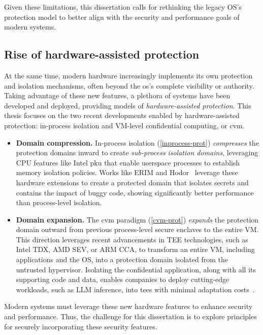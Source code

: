 Given these limitations, this dissertation calls for rethinking the legacy OS's protection model to better align with the security and performance goals of modern systems.




\subsection{Rise of hardware-assisted protection}

At the same time, modern hardware increasingly implements its own protection and isolation mechanisms, often beyond the \gls{os}'s complete visibility or authority.
Taking advantage of these new features, a plethora of systems have been developed and deployed, providing models of \emph{hardware-assisted protection}.
This thesis focuses on the two recent developments enabled by hardware-assisted protection: in-process isolation and VM-level confidential computing, or \gls{cvm}.

\begin{itemize}
	\item \textbf{Domain compression.} In-process isolation (\autoref{inprocess-prot}) \emph{compresses} the protection domains inward to create \emph{sub-process isolation domains}, leveraging CPU features like Intel \gls{pku} that enable  userspace processes to establish memory isolation policies.
	      Works like ERIM and Hodor~\cite{erim,hodor} leverage these hardware extensions to create a protected domain that isolates secrets and contains the impact of buggy code, showing significantly better performance than process-level isolation.
	\item \textbf{Domain expansion.} The \gls{cvm} paradigm (\autoref{cvm-prot}) \emph{expands} the protection domain outward from previous process-level secure enclaves to the entire VM.
	      This direction leverages recent advancements in TEE technologies, such as Intel TDX, AMD SEV, or ARM CCA, to transform an entire VM, including applications and the OS, into a protection domain isolated from the untrusted hypervisor.
	      Isolating the confidential application, along with all its supporting code and data, enables companies to deploy cutting-edge workloads, such as LLM inference, into \glspl{tee} with minimal adaptation costs~\cite{yifan2025pipellm}.
\end{itemize}



Modern systems must leverage these new hardware features to enhance security and performance.
Thus, the challenge for this dissertation is to explore principles for securely incorporating these security features.

